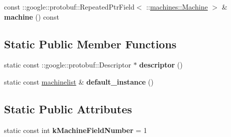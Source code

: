 \begin{DoxyCompactItemize}
\item 
const \+::google\+::protobuf\+::\+Repeated\+Ptr\+Field$<$ \+::\hyperlink{classmachines_1_1Machine}{machines\+::\+Machine} $>$ \& {\bfseries machine} () const \hypertarget{classmachines_1_1machinelist_a45f99c78c4cb6b6211ad7ad34ebcf6ed}{}\label{classmachines_1_1machinelist_a45f99c78c4cb6b6211ad7ad34ebcf6ed}

\end{DoxyCompactItemize}
\subsection*{Static Public Member Functions}
\begin{DoxyCompactItemize}
\item 
static const \+::google\+::protobuf\+::\+Descriptor $\ast$ {\bfseries descriptor} ()\hypertarget{classmachines_1_1machinelist_a2c61c1349537c46fa0d6ba2e499d6c83}{}\label{classmachines_1_1machinelist_a2c61c1349537c46fa0d6ba2e499d6c83}

\item 
static const \hyperlink{classmachines_1_1machinelist}{machinelist} \& {\bfseries default\+\_\+instance} ()\hypertarget{classmachines_1_1machinelist_a81dd449197eff541e427d328dffdc0a6}{}\label{classmachines_1_1machinelist_a81dd449197eff541e427d328dffdc0a6}

\end{DoxyCompactItemize}
\subsection*{Static Public Attributes}
\begin{DoxyCompactItemize}
\item 
static const int {\bfseries k\+Machine\+Field\+Number} = 1\hypertarget{classmachines_1_1machinelist_a25e357cfdda5b8c035e6ea085a029ae6}{}\label{classmachines_1_1machinelist_a25e357cfdda5b8c035e6ea085a029ae6}

\end{DoxyCompactItemize}
